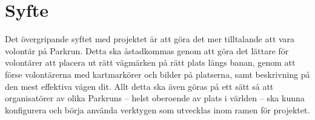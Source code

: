 \section{Syfte}
Det övergripande syftet med projektet är att göra det mer tilltalande att vara volontär på Parkrun. 
Detta ska åstadkommas genom att göra det lättare för volontärer att placera ut rätt vägmärken på rätt plats längs banan, genom att förse volontärerna med kartmarkörer och bilder på platserna, samt beskrivning på den mest effektiva vägen dit. 
Allt detta ska även göras på ett sätt så att organisatörer av olika Parkruns -- helst oberoende av plats i världen -- ska kunna konfigurera och börja använda verktygen som utvecklas inom ramen för projektet.